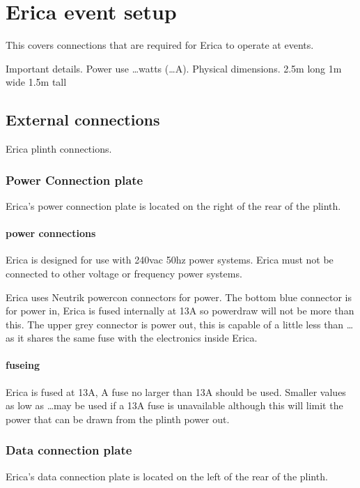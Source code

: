 \chapter{Erica event setup}

This covers connections that are required for Erica to operate at events.

Important details.
Power use \dots watts (\dots A).
Physical dimensions.
2.5m long
1m wide
1.5m tall


\section{External connections}

Erica plinth connections.

\subsection{Power Connection plate}

Erica's power connection plate is located on the right of the rear of the plinth.

\subsubsection{power connections}
Erica is designed for use with 240vac 50hz power systems. Erica must not be connected to other voltage or frequency power systems. 

Erica uses Neutrik powercon connectors for power.
The bottom blue connector is for power in, Erica is fused internally at 13A so powerdraw will not be more than this.
The upper grey connector is power out, this is capable of a little less than \dots as it shares the same fuse with the electronics inside Erica.

\subsubsection{fuseing}
Erica is fused at 13A, A fuse no larger than 13A should be used. Smaller values as low as \dots may be used if a 13A fuse is unavailable although this will limit the power that can be drawn from the plinth power out.

\subsection{Data connection plate}

Erica's data connection plate is located on the left of the rear of the plinth.

